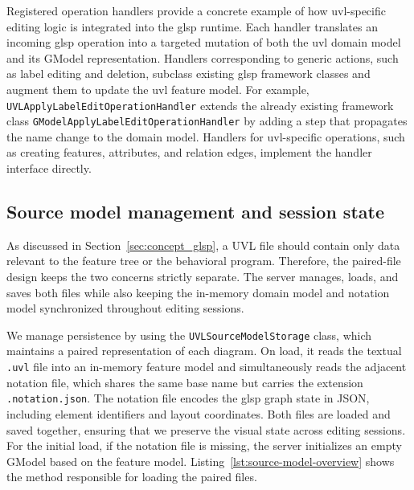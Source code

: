 Registered operation handlers provide a concrete example of how \gls{uvl}-specific editing logic is integrated into the \gls{glsp} runtime.
Each handler translates an incoming \gls{glsp} operation into a targeted mutation of both the \gls{uvl} domain model and its GModel representation.
Handlers corresponding to generic actions, such as label editing and deletion, subclass existing \gls{glsp} framework classes and augment them to update the \gls{uvl} feature model.
For example, \texttt{UVLApplyLabelEditOperationHandler} extends the already existing framework class \texttt{GModelApplyLabelEditOperationHandler} by adding a step that propagates the name change to the domain model.
Handlers for \gls{uvl}-specific operations, such as creating features, attributes, and relation edges, implement the handler interface directly.

\subsection{Source model management and session state}
\label{subsec:impl_overview_source_model}

As discussed in Section~\ref{sec:concept_glsp}, a UVL file should contain only data relevant to the feature tree or the behavioral program.
Therefore, the paired-file design keeps the two concerns strictly separate.
The server manages, loads, and saves both files while also keeping the in-memory domain model and notation model synchronized throughout editing sessions.

We manage persistence by using the \texttt{UVLSourceModelStorage} class, which maintains a paired representation of each diagram. 
On load, it reads the textual \texttt{.uvl} file into an in-memory feature model and simultaneously reads the adjacent notation file, which shares the same base name but carries the extension \texttt{.notation.json}.
The notation file encodes the \gls{glsp} graph state in JSON, including element identifiers and layout coordinates.
Both files are loaded and saved together, ensuring that we preserve the visual state across editing sessions.
For the initial load, if the notation file is missing, the server initializes an empty GModel based on the feature model.
Listing~\ref{lst:source-model-overview} shows the method responsible for loading the paired files.



